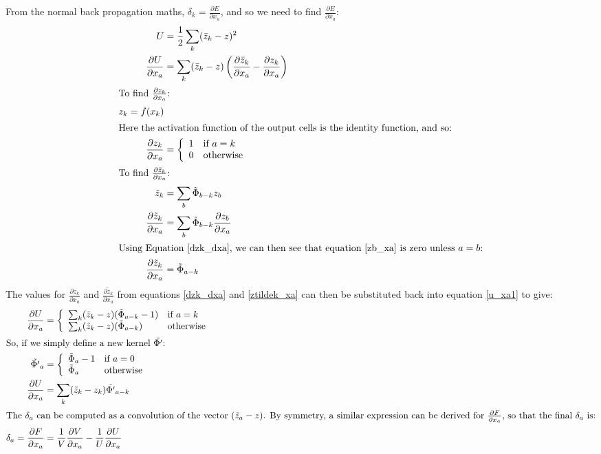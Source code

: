 \documentclass[a4paper]{article}
\newcommand{\zbar}{\bar{z}}
\newcommand{\ztilde}{\tilde{z}}
\newcommand{\skernel}{\tilde{\Phi}}
\newcommand{\dskernel}{\tilde{\Phi'}}
\newcommand{\pdiff}[2]{ \frac{\partial #1}{\partial #2}}
\begin{document}
From the normal back propagation maths, $\delta_k = \pdiff{E}{x_a}$,
and so we need to find $\pdiff{E}{x_a}$:
\begin{align}
  U &= \frac{1}{2} \sum_k (\zbar_k - z)^2 \\
  \pdiff{U}{x_a} &= \sum_k (\zbar_k - z) \left( \pdiff{\zbar_k}{x_a} - 
  \pdiff{z_k}{x_a} \right) \label{u_xa1}\\
\intertext{To find   $\pdiff{z_k}{x_a}$:}
z_k = f(x_k)\\
\intertext{Here the activation function of the output cells is the
  identity function, and so:}
\pdiff{z_k}{x_a} & = \left\{
  \begin{array}{ll}
    1 & \text{if $a=k$} \\
    0 & \text{otherwise} \\
  \end{array}
  \right. %
  \label{dzk_dxa}\\
  \intertext{To find $\pdiff{\ztilde_k}{x_a}$:}
  \ztilde_k  &= \sum_b \skernel_{b-k} z_b \\
  \pdiff{\ztilde_k}{x_a} &= \sum_b \skernel_{b-k} \pdiff{z_b}{x_a} 
\label{zb_xa}\\
\intertext{Using Equation \ref{dzk_dxa}, we can then see that equation
  \ref{zb_xa} is zero unless $a=b$:}
  \pdiff{\ztilde_k}{x_a} &= \skernel_{a-k} \label{ztildek_xa}
\end{align}
The values for $\pdiff{z_k}{x_a}$ and $\pdiff{\ztilde_k}{x_a}$ from
equations \ref{dzk_dxa} and \ref{ztildek_xa} can then be substituted
back into equation \ref{u_xa1} to give:
\begin{align}
  \pdiff{U}{x_a} &= \left\{
    \begin{array}{ll}
      \sum_k (\ztilde_k - z) ( \skernel_{a-k} - 1) & \text{if $a=k$}
      \\
      \sum_k (\ztilde_k - z) ( \skernel_{a-k}) & \text{otherwise}\\
    \end{array}
    \right.\\
\intertext{So, if we simply define a new kernel $\dskernel$:}
\dskernel_a &= \left \{
  \begin{array}{ll}
    \skernel_a -1 & \text{if $a=0$} \\
    \skernel_a & \text{otherwise} \\
  \end{array}
  \right. \\
\pdiff{U}{x_a} &= \sum_k (\ztilde_k - z_k) \dskernel_{a-k} \\
\intertext{The $\delta_a$ can be computed as a convolution of the vector $(
\ztilde_a - z )$.  By symmetry, a similar expression can be derived
for $\pdiff{F}{x_a}$, so that the final $\delta_a$ is:}
\delta_a = \pdiff{F}{x_a} &= \frac{1}{V} \pdiff{V}{x_a} - 
\frac{1}{U} \pdiff{U}{x_a}
\end{align}
\end{document}
